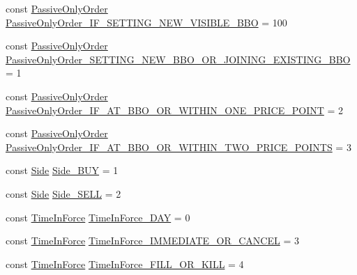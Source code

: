 \begin{DoxyCompactItemize}
\item 
const \hyperlink{namespaceMetal_1_1LSE_afb7bdec752b9048b6d725e2421586a64}{Passive\+Only\+Order} \hyperlink{namespaceMetal_1_1LSE_aded8245259beeaf19ed004bb5f0bddeb}{Passive\+Only\+Order\+\_\+\+I\+F\+\_\+\+S\+E\+T\+T\+I\+N\+G\+\_\+\+N\+E\+W\+\_\+\+V\+I\+S\+I\+B\+L\+E\+\_\+\+B\+B\+O} = 100
\item 
const \hyperlink{namespaceMetal_1_1LSE_afb7bdec752b9048b6d725e2421586a64}{Passive\+Only\+Order} \hyperlink{namespaceMetal_1_1LSE_a6a101dc06e096e15e933da76079a83ce}{Passive\+Only\+Order\+\_\+\+S\+E\+T\+T\+I\+N\+G\+\_\+\+N\+E\+W\+\_\+\+B\+B\+O\+\_\+\+O\+R\+\_\+\+J\+O\+I\+N\+I\+N\+G\+\_\+\+E\+X\+I\+S\+T\+I\+N\+G\+\_\+\+B\+B\+O} = 1
\item 
const \hyperlink{namespaceMetal_1_1LSE_afb7bdec752b9048b6d725e2421586a64}{Passive\+Only\+Order} \hyperlink{namespaceMetal_1_1LSE_afbb3e1690207cb4acc098c82d025593a}{Passive\+Only\+Order\+\_\+\+I\+F\+\_\+\+A\+T\+\_\+\+B\+B\+O\+\_\+\+O\+R\+\_\+\+W\+I\+T\+H\+I\+N\+\_\+\+O\+N\+E\+\_\+\+P\+R\+I\+C\+E\+\_\+\+P\+O\+I\+N\+T} = 2
\item 
const \hyperlink{namespaceMetal_1_1LSE_afb7bdec752b9048b6d725e2421586a64}{Passive\+Only\+Order} \hyperlink{namespaceMetal_1_1LSE_acc6911888ca458a424864c40d4670085}{Passive\+Only\+Order\+\_\+\+I\+F\+\_\+\+A\+T\+\_\+\+B\+B\+O\+\_\+\+O\+R\+\_\+\+W\+I\+T\+H\+I\+N\+\_\+\+T\+W\+O\+\_\+\+P\+R\+I\+C\+E\+\_\+\+P\+O\+I\+N\+T\+S} = 3
\item 
const \hyperlink{namespaceMetal_1_1LSE_af5236b7a999484d8cd5b579b7d7c133b}{Side} \hyperlink{namespaceMetal_1_1LSE_ab0b5f1065caba331aada2c604df46d38}{Side\+\_\+\+B\+U\+Y} = 1
\item 
const \hyperlink{namespaceMetal_1_1LSE_af5236b7a999484d8cd5b579b7d7c133b}{Side} \hyperlink{namespaceMetal_1_1LSE_a3e15baa68623e95c448fa4eab3103e51}{Side\+\_\+\+S\+E\+L\+L} = 2
\item 
const \hyperlink{namespaceMetal_1_1LSE_a59a4a742606e572af3f14a34a7503ee9}{Time\+In\+Force} \hyperlink{namespaceMetal_1_1LSE_a53152094a07b3f46029664dd4ab971b9}{Time\+In\+Force\+\_\+\+D\+A\+Y} = 0
\item 
const \hyperlink{namespaceMetal_1_1LSE_a59a4a742606e572af3f14a34a7503ee9}{Time\+In\+Force} \hyperlink{namespaceMetal_1_1LSE_a15d4a38ec3dfbbba168886ec6c8c2731}{Time\+In\+Force\+\_\+\+I\+M\+M\+E\+D\+I\+A\+T\+E\+\_\+\+O\+R\+\_\+\+C\+A\+N\+C\+E\+L} = 3
\item 
const \hyperlink{namespaceMetal_1_1LSE_a59a4a742606e572af3f14a34a7503ee9}{Time\+In\+Force} \hyperlink{namespaceMetal_1_1LSE_ab967b745cddcda72052e5eb680065535}{Time\+In\+Force\+\_\+\+F\+I\+L\+L\+\_\+\+O\+R\+\_\+\+K\+I\+L\+L} = 4

\end{DoxyCompactItemize}
